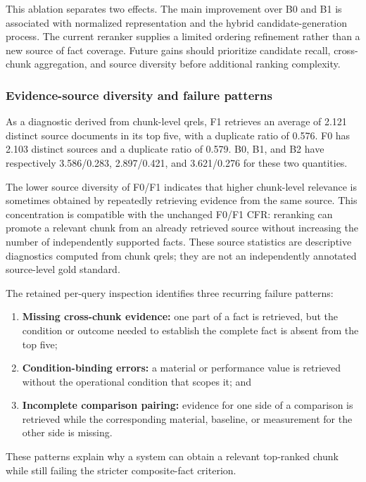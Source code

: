 This ablation separates two effects. The main improvement over B0 and B1 is associated with normalized representation and the hybrid candidate-generation process. The current reranker supplies a limited ordering refinement rather than a new source of fact coverage. Future gains should prioritize candidate recall, cross-chunk aggregation, and source diversity before additional ranking complexity.

\subsubsection{Evidence-source diversity and failure patterns}

As a diagnostic derived from chunk-level qrels, F1 retrieves an average of 2.121 distinct source documents in its top five, with a duplicate ratio of 0.576. F0 has 2.103 distinct sources and a duplicate ratio of 0.579. B0, B1, and B2 have respectively 3.586/0.283, 2.897/0.421, and 3.621/0.276 for these two quantities.

The lower source diversity of F0/F1 indicates that higher chunk-level relevance is sometimes obtained by repeatedly retrieving evidence from the same source. This concentration is compatible with the unchanged F0/F1 CFR: reranking can promote a relevant chunk from an already retrieved source without increasing the number of independently supported facts. These source statistics are descriptive diagnostics computed from chunk qrels; they are not an independently annotated source-level gold standard.

The retained per-query inspection identifies three recurring failure patterns:

\begin{enumerate}
\item \textbf{Missing cross-chunk evidence:} one part of a fact is retrieved, but the condition or outcome needed to establish the complete fact is absent from the top five;
\item \textbf{Condition-binding errors:} a material or performance value is retrieved without the operational condition that scopes it; and
\item \textbf{Incomplete comparison pairing:} evidence for one side of a comparison is retrieved while the corresponding material, baseline, or measurement for the other side is missing.
\end{enumerate}

These patterns explain why a system can obtain a relevant top-ranked chunk while still failing the stricter composite-fact criterion.

